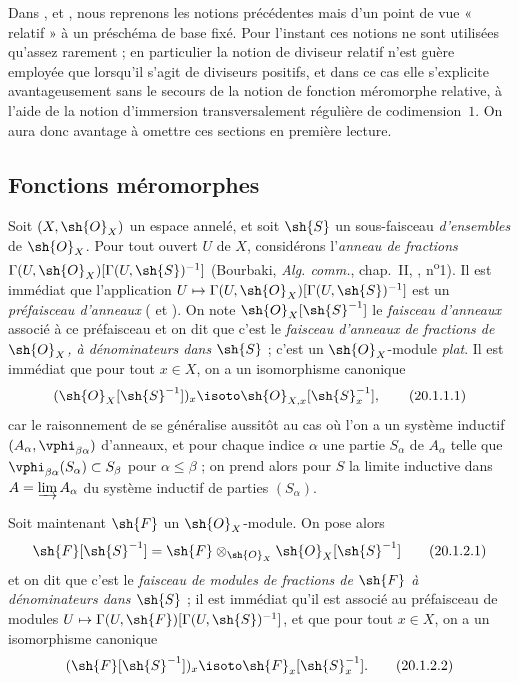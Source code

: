 Dans ,  et , nous reprenons les notions précédentes mais d'un point de vue « relatif » à un préschéma de base fixé.
Pour l'instant ces notions ne sont utilisées qu'assez rarement ; en particulier la notion de diviseur relatif n'est guère employée que lorsqu'il s'agit de diviseurs positifs, et dans ce cas elle s'explicite avantageusement sans le secours de la notion de fonction méromorphe relative, à l'aide de la notion d'immersion transversalement régulière de codimension~$1$.
On aura donc avantage à omettre ces sections en première lecture.

\subsection{Fonctions méromorphes}
\label{IV.20.1}

\begin{env}[20.1.1]
\label{IV.20.1.1}
Soit $(X,\sh{O}_X)$ un espace annelé, et soit $\sh{S}$ un sous-faisceau \emph{d'ensembles} de $\sh{O}_X$.
Pour tout ouvert $U$ de $X$, considérons l'\emph{anneau de fractions} $\Gamma(U,\sh{O}_X)[\Gamma(U,\sh{S})^{-1}]$ (Bourbaki, \emph{Alg. comm.}, chap.~II, , n\textsuperscript{o}1).
Il est immédiat que l'application $U\mapsto\Gamma(U,\sh{O}_X)[\Gamma(U,\sh{S})^{-1}]$ est un \emph{préfaisceau d'anneaux} ( et ).
On note $\sh{O}_X[\sh{S}^{-1}]$ le \emph{faisceau d'anneaux} associé à ce préfaisceau et on dit que c'est le \emph{faisceau d'anneaux de fractions de $\sh{O}_X$, à dénominateurs dans $\sh{S}$} ; c'est un $\sh{O}_X$-module \emph{plat}.
Il est immédiat que pour tout $x\in X$, on a un isomorphisme canonique
\[
\label{IV.20.1.1.1}
  (\sh{O}_X[\sh{S}^{-1}])_x\isoto\sh{O}_{X,x}[\sh{S}_x^{-1}],
  \tag{20.1.1.1}
\]
car le raisonnement de  se généralise aussitôt au cas où l'on a un système inductif $(A_\alpha,\vphi_{\beta\alpha})$ d'anneaux, et pour chaque indice $\alpha$ une partie $S_\alpha$ de $A_\alpha$ telle que
$\vphi_{\beta\alpha}(S_\alpha)\subset S_\beta$ pour $\alpha\leq\beta$ ; on prend alors pour $S$ la limite inductive dans $A=\varinjlim A_\alpha$ du système inductif de parties $(S_\alpha)$.
\end{env}

\begin{env}[20.1.2]
\label{IV.20.1.2}
Soit maintenant $\sh{F}$ un $\sh{O}_X$-module.
On pose alors
\[
\label{IV.20.1.2.1}
  \sh{F}[\sh{S}^{-1}]=\sh{F}\otimes_{\sh{O}_X}\sh{O}_X[\sh{S}^{-1}]
  \tag{20.1.2.1}
\]
et on dit que c'est le \emph{faisceau de modules de fractions de $\sh{F}$ à dénominateurs dans $\sh{S}$} ; il est immédiat qu'il est associé au préfaisceau de modules $U\mapsto\Gamma(U,\sh{F})[\Gamma(U,\sh{S})^{-1}]$, et que pour tout $x\in X$, on a un isomorphisme canonique
\[
\label{IV.20.1.2.2}
  (\sh{F}[\sh{S}^{-1}])_x\isoto\sh{F}_x[\sh{S}_x^{-1}].
  \tag{20.1.2.2}
\]
\end{env}

